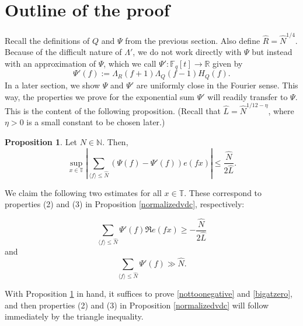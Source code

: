 \documentclass{article}
\theoremstyle{definition}
\newtheorem{prop}{Proposition}[section]
\theoremstyle{definition}
\theoremstyle{remark}
\newcommand{\R}{\mathbb{R}}
\newcommand{\N}{\mathbb{N}}
\newcommand{\F}{\mathbb{F}_q[t]}
\newcommand{\1}{\mathbf{1}}
\numberwithin{equation}{section}
\begin{document}
\section{Outline of the proof}
Recall the definitions of $Q$ and $\Psi$ from the previous section. Also define $\widehat{R}=\widehat{N}^{1\slash 4}$. Because of the difficult nature of $\Lambda'$, we do not work directly with $\Psi$ but instead with an approximation of $\Psi$, which we call $\Psi': \F\to \R$ given by 
\[\Psi'(f):=\Lambda_R(f+1)\Lambda_Q(f-1)H_Q(f).\]
In a later section, we show $\Psi$ and $\Psi'$ are uniformly close in the Fourier sense. This way, the properties we prove for the exponential sum $\Psi'$ will readily transfer to $\Psi$. This is the content of the following proposition. (Recall that $\widehat{L}=\widehat{N}^{1\slash 12-\eta}$, where $\eta>0$ is a small constant to be chosen later.)
\begin{prop}\label{fourierclose}
Let $N\in \N$. Then, 
\[\sup_{x\in \mathbb{T}} \left|\sum_{\langle f\rangle \leq \widehat{N}} (\Psi(f)-\Psi'(f))e(fx)\right|\leq \frac{\widehat{N}}{2\widehat{L}}.\]
\end{prop}


We claim the following two estimates for all $x\in \mathbb{T}$. These correspond to properties (2) and (3) in Proposition \ref{normalizedvdc}, respectively: 

\begin{equation}\label{nottoonegative}
\sum_{\langle f\rangle \leq \widehat{N}} \Psi'(f)\Re e(fx)\geq -\frac{\widehat{N}}{2\widehat{L}}
\end{equation}
and 
\begin{equation}\label{bigatzero}
\sum_{\langle f\rangle \leq \widehat{N}} \Psi'(f)\gg \widehat{N}.
\end{equation}

With Proposition \ref{fourierclose} in hand, it suffices to prove \eqref{nottoonegative} and \eqref{bigatzero}, and then properties (2) and (3) in Proposition \ref{normalizedvdc} will follow immediately by the triangle inequality. 
\end{document}
